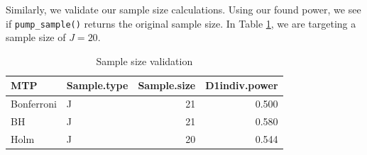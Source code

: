 \documentclass{article}
\begin{document}
Similarly, we validate our sample size calculations. Using our found
power, we see if \texttt{pump\_sample()} returns the original sample
size. In Table \ref{tab:ss}, we are targeting a sample size of
\(J = 20\).

\begin{table}[h!]
\centering
\begin{tabular}{llrr}
\toprule
MTP & Sample.type & Sample.size & D1indiv.power\\
\midrule
Bonferroni & J & 21 & 0.500\\
BH & J & 21 & 0.580\\
Holm & J & 20 & 0.544\\
\bottomrule
\end{tabular}
\label{tab:ss}
\caption{Sample size validation}
\end{table}



\end{document}

